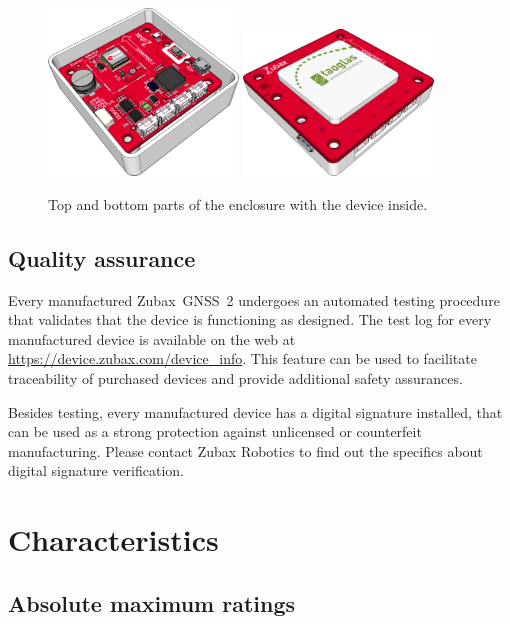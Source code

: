 \documentclass{zubaxdoc}
\begin{document}
\begin{figure}[hbt]
	\centering
	\includegraphics[width=0.45\textwidth]{enclosure_pcb_top}
	\includegraphics[width=0.45\textwidth]{enclosure_pcb_bottom}
	\caption{Top and bottom parts of the enclosure with the device inside.}
\end{figure}

\section{Quality assurance}

Every manufactured Zubax~GNSS~2 undergoes an automated testing procedure that validates that
the device is functioning as designed.
The test log for every manufactured device is available on the web at
\url{https://device.zubax.com/device_info}.
This feature can be used to facilitate traceability of purchased devices and
provide additional safety assurances.

Besides testing, every manufactured device has a digital signature installed,
that can be used as a strong protection against unlicensed or counterfeit manufacturing.
Please contact Zubax Robotics
to find out the specifics about digital signature verification.

\chapter{Characteristics}

\section{Absolute maximum ratings}
\end{document}
